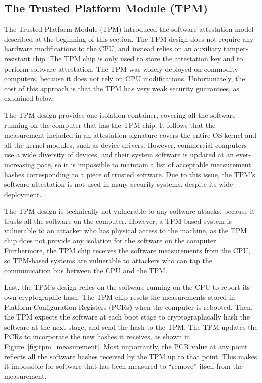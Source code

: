 \subsection{The Trusted Platform Module (TPM)}
\label{sec:tpm}

The Trusted Platform Module (TPM) \cite{grawrock2003tpm} introduced the
software attestation model described at the beginning of this section. The TPM
design does not require any hardware modifications to the CPU, and instead
relies on an auxiliary tamper-resistant chip. The TPM chip is only used to
store the attestation key and to perform software attestation. The TPM was
widely deployed on commodity computers, because it does not rely on CPU
modifications. Unfortunately, the cost of this approach is that the TPM has
very weak security guarantees, as explained below.

The TPM design provides one isolation container, covering all the software
running on the computer that has the TPM chip. It follows that the measurement
included in an attestation signature covers the entire OS kernel and all the
kernel modules, such as device drivers. However, commercial computers use a
wide diversity of devices, and their system software is updated at an
ever-increasing pace, so it is impossible to maintain a list of acceptable
measurement hashes corresponding to a piece of trusted software. Due to this
issue, the TPM's software attestation is not used in many security systems,
despite its wide deployment.

The TPM design is technically not vulnerable to any software attacks, because
it trusts all the software on the computer. However, a TPM-based system is
vulnerable to an attacker who has physical access to the machine, as the TPM
chip does not provide any isolation for the software on the computer.
Furthermore, the TPM chip receives the software measurements from the CPU,
so TPM-based systems are vulnerable to attackers who can tap the communication
bus between the CPU and the TPM.

Last, the TPM's design relies on the software running on the CPU to report its
own cryptographic hash. The TPM chip resets the measurements stored in Platform
Configuration Registers (PCRs) when the computer is rebooted. Then, the TPM
expects the software at each boot stage to cryptographically hash the software
at the next stage, and send the hash to the TPM. The TPM updates the PCRs to
incorporate the new hashes it receives, as shown in
Figure~\ref{fig:tpm_measurement}. Most importantly, the PCR value at any point
reflects all the software hashes received by the TPM up to that point. This
makes it impossible for software that has been measured to ``remove'' itself
from the measurement.

